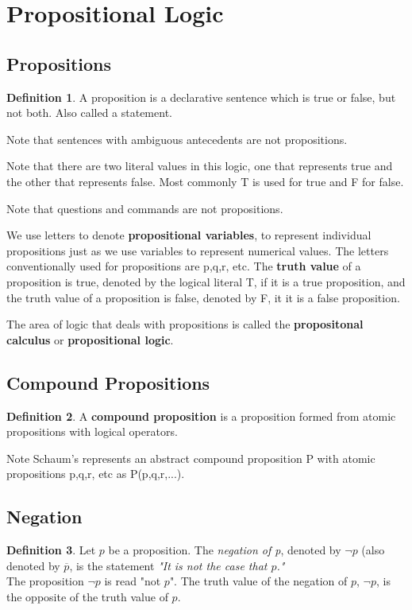 \documentclass[11pt]{book} %
\theoremstyle {definition}
\newtheorem {definition}{Definition}[section]
\theoremstyle {remark}
\begin{document}
\section {Propositional Logic}
   \subsection {Propositions}
\begin {definition}
A proposition is a declarative sentence which is true or false, but not both. Also called a statement.
\end {definition}

Note that sentences with ambiguous antecedents are not propositions.

Note that there are two literal values in this logic, one that represents true and the other that represents false. Most commonly T is used for true and F for false.

Note that questions and commands are not propositions.

We use letters to denote \textbf{propositional variables}, to represent individual propositions just as we use variables to represent numerical values. The letters conventionally used for propositions are p,q,r, etc. The \textbf{truth value} of a proposition is true, denoted by the logical literal T, if it is a true proposition, and the truth value of a proposition is false, denoted by F, it it is a false proposition. 

The area of logic that deals with propositions is called the \textbf{propositonal calculus} or \textbf{propositional logic}. 

    \subsection {Compound Propositions}
    \begin {definition}
    A \textbf{compound proposition} is a proposition formed from atomic propositions with logical operators. 
    \end {definition}

Note Schaum's represents an abstract compound proposition P with atomic propositions p,q,r, etc as P(p,q,r,...).

    \subsection {Negation}
    \begin {definition}
    Let $p$ be a proposition. The \textit{negation of p}, denoted by $\lnot p$ (also denoted by $\overline{p}$, is the statement 
\textit{"It is not the case that $p$."}\\
The proposition $\lnot p$ is read "not $p$". The truth value of the negation of $p$,  $\lnot p$, is the opposite of the truth value of $p$.
    \end {definition} 
    
\end{document}
